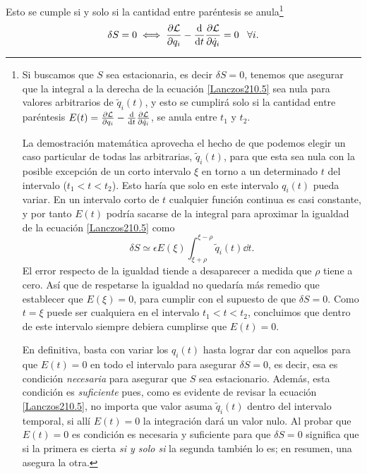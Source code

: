 \documentclass[12pt, spanish, a4paper, ]{article}
\begin{document}
Esto se cumple si y solo si la cantidad entre paréntesis se anula\footnote{
Si buscamos que \(S\) sea estacionaria, es decir \(\delta S = 0\), tenemos que asegurar que la integral a la derecha de la ecuación \eqref{Lanczos210.5} sea nula para valores arbitrarios de \(\tilde{q}_i (t)\), y esto se cumplirá solo si la cantidad entre paréntesis \(E(t)= \pdv{\mathcal{L}}{q_i} - \dv{t} \pdv{\mathcal{L}}{\dot{q}_i}\), se anula entre \(t_1\) y \(t_2\).

La demostración matemática aprovecha el hecho de que podemos elegir un caso particular de todas las arbitrarias, \(\tilde{q}_i (t)\), para que esta sea nula con la posible excepción de un corto intervalo \(\xi\) en torno a un determinado \(t\) del intervalo (\(t_1 < t < t_2\)).
Esto haría que solo en este intervalo \(q_i(t)\) pueda variar.
En un intervalo corto de \(t\) cualquier función continua es casi constante, y por tanto \(E(t)\) podría sacarse de la integral para aproximar la igualdad de la ecuación \eqref{Lanczos210.5} como
\begin{equation}\label{Lanczos210.8}
    \delta S \simeq \epsilon E(\xi) \int_{\xi+ \rho}^{\xi - \rho} \tilde{q}_i (t) \dd{t}.
    \tag{Lanczos 210.8}
\end{equation}
El error respecto de la igualdad tiende a desaparecer a medida que \(\rho\) tiene a cero.
Así que de respetarse la igualdad no quedaría más remedio que establecer que \(E(\xi) = 0\), para cumplir con el supuesto de que \(\delta S=0\).
Como \(t=\xi\) puede ser cualquiera en el intervalo \(t_1<t<t_2\), concluimos que dentro de este intervalo siempre debiera cumplirse que \(E(t)=0\).

En definitiva, basta con variar los \(q_i(t)\) hasta lograr dar con aquellos para que \(E(t) = 0\) en todo el intervalo para asegurar \(\delta S = 0\), es decir, esa es condición \emph{necesaria} para asegurar que \(S\) sea estacionario.
Además, esta condición es \emph{suficiente} pues, como es evidente de revisar la ecuación \eqref{Lanczos210.5}, no importa que valor asuma \(\tilde{q}_i (t)\) dentro del intervalo temporal, si allí \(E(t) =0 \) la integración dará un valor nulo.
Al probar que \(E(t) = 0\) es condición es necesaria y suficiente para que \(\delta S = 0\) significa que si la primera es cierta \emph{si y solo si} la segunda también lo es; 
en resumen, una asegura la otra.
}
\begin{equation}
	\delta S=0 \iff \pdv{\mathcal{L}}{q_i} - \dv{t} \pdv{\mathcal{L}}{\dot{q}_i}= 0 \; \; \; \forall i.
    \label{noiEulerLagrange}
\end{equation}
\end{document}
